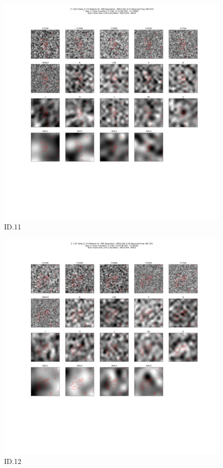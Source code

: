 \begin{figure}[tbp]
\centering \includegraphics[width=120mm]{Matched/ASPECS_Cutout_11.png}
\caption{ID.11}
\label{fig:Match_Three}
\end{figure}

\begin{figure}[tbp]
\centering \includegraphics[width=120mm]{Matched/ASPECS_Cutout_12.png}
\caption{ID.12}
\label{fig:Match_Three}
\end{figure}

